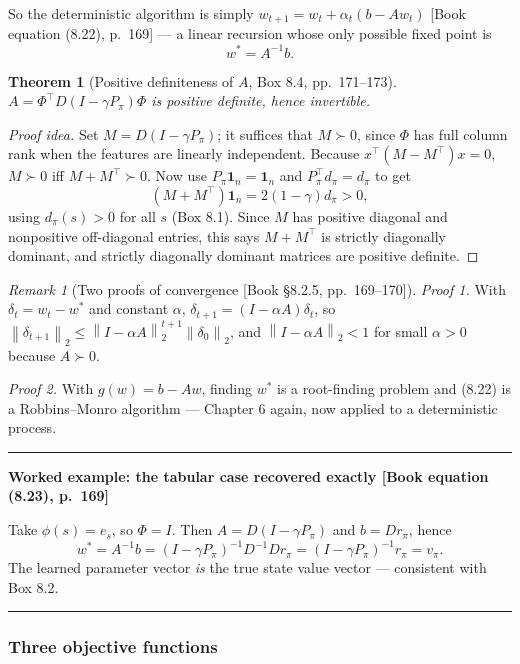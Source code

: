 \documentclass[11pt, letterpaper]{article}
\theoremstyle{runin}
\theoremstyle{runinplain}
\newtheorem{theorem}{Theorem}[section]
\theoremstyle{remark}
\newtheorem*{remark}{Remark}
\newcommand{\norm}[1]{\left\lVert #1 \right\rVert}
\newcommand{\bkin}[1]{{\color{bookblue}\small[\textsf{Book #1}]}}
\newenvironment{worked}[1]
  {\par\medskip\noindent\rule{\textwidth}{0.4pt}\par\nobreak\vspace{0.3em}
   \noindent\textbf{Worked example: #1}\par\nobreak\vspace{0.2em}\small}
  {\par\nobreak\vspace{0.3em}\noindent\rule{\textwidth}{0.4pt}\par\medskip}
\begin{document}
So the deterministic algorithm is simply
$w_{t+1}=w_t+\alpha_t(b-Aw_t)$ \bkin{equation (8.22), p.~169} --- a linear recursion
whose only possible fixed point is
\[
  \boxed{\;w^*=A^{-1}b.\;}
\]

\begin{theorem}[Positive definiteness of $A$, Box 8.4, pp.~171--173]
$A=\Phi^{\!\top}D(I-\gamma P_\pi)\Phi$ is positive definite, hence invertible.
\end{theorem}

\begin{proof}[Proof idea]
Set $M=D(I-\gamma P_\pi)$; it suffices that $M\succ0$, since $\Phi$ has full column
rank when the features are linearly independent. Because
$x^{\!\top}(M-M^{\!\top})x=0$, $M\succ0$ iff $M+M^{\!\top}\succ0$. Now use
$P_\pi\mathbf 1_n=\mathbf 1_n$ and $P_\pi^{\!\top}d_\pi=d_\pi$ to get
\[
  (M+M^{\!\top})\mathbf 1_n=2(1-\gamma)d_\pi>0,
\]
using $d_\pi(s)>0$ for all $s$ (Box 8.1). Since $M$ has positive diagonal and
nonpositive off-diagonal entries, this says $M+M^{\!\top}$ is strictly diagonally
dominant, and strictly diagonally dominant matrices are positive definite.
\end{proof}

\begin{remark}[Two proofs of convergence \bkin{\S8.2.5, pp.~169--170}]
\emph{Proof 1.} With $\delta_t=w_t-w^*$ and constant $\alpha$,
$\delta_{t+1}=(I-\alpha A)\delta_t$, so
$\norm{\delta_{t+1}}_2\le\norm{I-\alpha A}_2^{t+1}\norm{\delta_0}_2$, and
$\norm{I-\alpha A}_2<1$ for small $\alpha>0$ because $A\succ0$.

\emph{Proof 2.} With $g(w)=b-Aw$, finding $w^*$ is a root-finding problem and
(8.22) is a Robbins--Monro algorithm --- Chapter 6 again, now applied to a
deterministic process.
\end{remark}

\begin{worked}{the tabular case recovered exactly \bkin{equation (8.23), p.~169}}
Take $\phi(s)=e_s$, so $\Phi=I$. Then $A=D(I-\gamma P_\pi)$ and $b=Dr_\pi$, hence
\[
  w^*=A^{-1}b=(I-\gamma P_\pi)^{-1}D^{-1}Dr_\pi=(I-\gamma P_\pi)^{-1}r_\pi=v_\pi .
\]
The learned parameter vector \emph{is} the true state value vector --- consistent
with Box 8.2.
\end{worked}

\subsubsection{Three objective functions}
\end{document}
